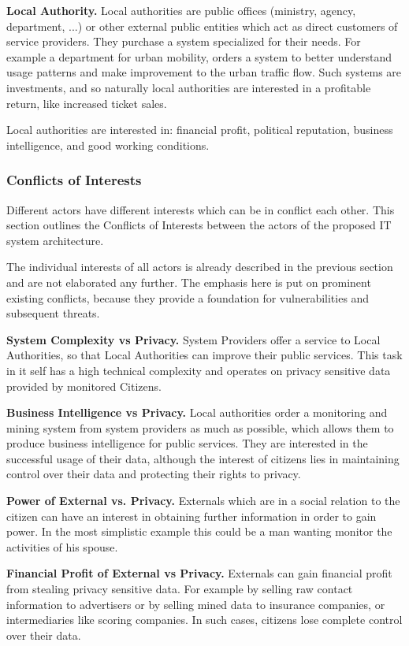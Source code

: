 \documentclass[runningheads,a4paper]{llncs}
\begin{document}
\textbf{Local Authority.}
Local authorities are public offices (ministry, agency, department, ...) or other external public entities which act as direct customers of service providers.
They purchase a system specialized for their needs.
For example a department for urban mobility, orders a system to better understand usage patterns and make improvement to the urban traffic flow. Such systems are investments, and so naturally local authorities are interested in a profitable return, like increased ticket sales.

Local authorities are interested in: financial profit, political reputation, business intelligence, and good working conditions.


\subsubsection{Conflicts of Interests}
\label{subsubsection:Conflicts of Interests}
Different actors have different interests which can be in conflict each other. This section outlines the Conflicts of Interests between the actors of the proposed IT system architecture.

The individual interests of all actors is already described in the previous section and are not elaborated any further.
The emphasis here is put on prominent existing conflicts, because they provide a foundation for vulnerabilities and subsequent threats.


\textbf{System Complexity vs Privacy.}
System Providers offer a service to Local Authorities, so that Local Authorities can improve their public services. This task in it self has a high technical complexity and operates on privacy sensitive data provided by monitored Citizens.

\textbf{Business Intelligence vs Privacy.}
Local authorities order a monitoring and mining system from system providers as much as possible, which allows them to produce business intelligence for public services. They are interested in the successful usage of their data, although the interest of citizens lies in maintaining control over their data and protecting their rights to privacy.

\textbf{Power of External vs. Privacy.}
Externals which are in a social relation to the citizen can have an interest in obtaining further information in order to gain power. In the most simplistic example this could be a man wanting monitor the activities of his spouse.


\textbf{Financial Profit of External vs Privacy.}
Externals can gain financial profit from stealing privacy sensitive data.
For example by selling raw contact information to advertisers or by selling mined data to insurance companies, or intermediaries like scoring companies. In such cases, citizens lose complete control over their data.
\end{document}
